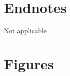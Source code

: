 \documentclass{bmcart}
\begin{document}
\begin{backmatter}
\section*{Endnotes}  
Not applicable  

%




\section*{Figures}


\end{backmatter}
\end{document}
